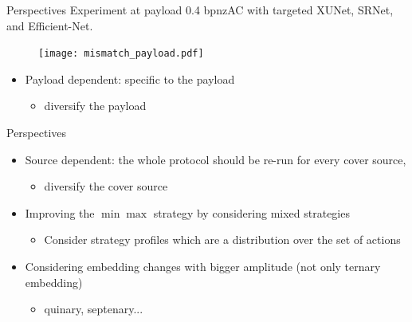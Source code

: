 \documentclass[10pt,aspectratio=169]{beamer}
\begin{document}
\begin{frame}{Perspectives}
    Experiment at payload \alert{0.4 bpnzAC} with targeted XUNet, SRNet, and Efficient-Net.
    \begin{figure}[h]
        \texttt{[image: mismatch\_payload.pdf]}
    \end{figure}
    
    \begin{itemize}
        \item Payload dependent: specific to the payload
            \begin{itemize}
                \item diversify the payload
            \end{itemize}
    \end{itemize}

\end{frame}



\begin{frame}{Perspectives}
  
    \begin{itemize}
        \setlength\itemsep{2em}
    
        \item Source dependent: the whole protocol should be re-run for every cover source,  
                
            \begin{itemize}
                \item diversify the cover source
            \end{itemize}
            
        \pause 
        
        \item Improving the $\min\max$ strategy by considering mixed strategies
            \begin{itemize}
                \item Consider strategy profiles which are a distribution over the set of actions
            \end{itemize}

        \item Considering embedding changes with bigger amplitude (not only ternary embedding)
            \begin{itemize}
                \item quinary, septenary...
            \end{itemize}

    
    \end{itemize}

\end{frame}


%
%
\end{document}
